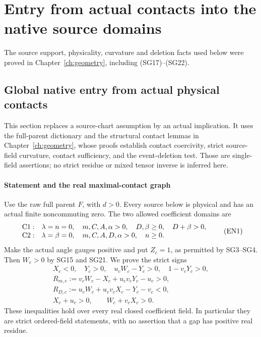 \chapter{Entry from actual contacts into the native source domains}
\label{ch:entry}
\label{component:p477c0ac30750}
\label{p477c0ac30750:sec:rederived-contact-entry}
The source support, physicality, curvature and deletion facts used below were proved in Chapter~\ref{ch:geometry}, including (SG17)--(SG22).
\section{\texorpdfstring{Global native entry from actual physical contacts}{Global native entry from actual physical contacts}}
\label{component:paf13bbf8fd32}

\label{paf13bbf8fd32:sec:global-native-entry-rederived}

This section replaces a source-chart assumption by an actual implication.
It uses the full-parent dictionary and the structural contact lemmas in Chapter~\ref{ch:geometry}, whose proofs establish
contact coercivity, strict source-field curvature, contact sufficiency,
and the event-deletion test.  Those are single-field assertions; no
strict residue or mixed tensor inverse is inferred here.

\subsubsection*{Statement and the real maximal-contact graph}

Use the raw full parent \(F\), with \(d>0\).
Every source below is physical and has an actual finite noncommuting
zero.  The two allowed coefficient domains are
\[
\begin{array}{ll}
 {\rm C1}:&\lambda=n=0,\quad m,C,A,\alpha>0,\quad
 D,\beta\ge0,\quad D+\beta>0,\\
 {\rm C2}:&\lambda=\beta=0,\quad m,C,A,D,\alpha>0,\quad n\ge0.
\end{array}\tag{EN1}
\]
Make the actual angle gauges positive and put \(Z_c=1\), as permitted
by SG3--SG4.  Then \(W_c>0\) by SG15 and SG21.  We prove the strict signs
\[
\begin{gathered}
 X_c<0,\quad Y_c>0,\quad u_cW_c-Y_c>0,\quad
 1-v_cY_c>0,\\
 R_{m,c}:=v_cW_c-X_c+u_cv_cY_c-u_c>0,\\
 R_{D,c}:=u_cW_c+u_cv_cX_c-Y_c-v_c<0,\\
 X_c+u_c>0,\qquad W_c+v_cX_c>0.
\end{gathered}\tag{EN2}
\]
These inequalities hold over every real closed coefficient field.
In particular they are strict ordered-field statements, with no
assertion that a gap has positive real residue.

